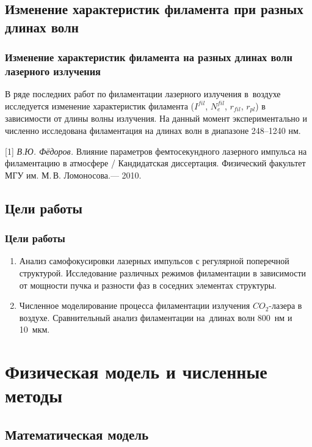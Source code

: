 \documentclass[fullscreen=true,unicode,bookmarks=true]{beamer}
\begin{document}
    \subsection{Изменение характеристик филамента при разных длинах волн}

    \begin{frame}
        \frametitle{Изменение характеристик филамента на разных длинах волн лазерного излучения}

		В ряде последних работ по филаментации лазерного излучения в~воздухе
		исследуется изменение характеристик филамента
		($I^{fil}$, $N_e^{fil}$, $r_{fil}$, $r_{pl}$) в зависимости от длины волны излучения.
		На данный момент экспериментально и численно исследована филаментация
		на длинах волн в диапазоне 248--1240 нм.
		
		\vfill		
		
        [1] \textit{В.Ю. Фёдоров.}
		Влияние параметров фемтосекундного лазерного импульса на филаментацию в атмосфере /
		Кандидатская диссертация. Физический факультет МГУ им. М.\,В. Ломоносова.— 2010.
    \end{frame}

    \subsection{Цели работы}

    \begin{frame}
        \frametitle{Цели работы}

        \begin{enumerate}
			\item Анализ самофокусировки лазерных импульсов с регулярной поперечной структурой.
			      Исследование различных режимов филаментации в зависимости от мощности пучка
			      и разности фаз в соседних элементах структуры.
			\item Численное моделирование процесса филаментации излучения $CO_2$-лазера в воздухе.
			      Сравнительный анализ филаментации на~длинах волн 800~нм и 10~мкм.
		\end{enumerate}
    \end{frame}

    \section{Физическая модель и численные методы}

	\subsection{Математическая модель}
\end{document}
